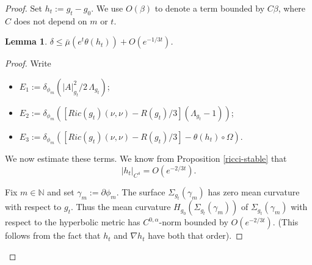 \documentclass[11pt]{amsart}
\def\N{\mathbb N}
\newtheorem{lemm}[thm]{Lemma}
\theoremstyle{remark}
\theoremstyle{definition}
\begin{document}
{{\begin{proof}
		Set $h_t:=g_t-g_0$. We use $O(\beta)$ to denote a term bounded by  $C\beta$, where $C$ does not depend on $m$ or $t$.
		\begin{lemm}
			$\delta \leq \bar\mu(e^t\theta(h_t))+O(e^{-1/3t})$.
		\end{lemm}
		\begin{proof}
			
			Write
			\begin{itemize}
				\item $E_1:=\delta_{\phi_m}({|A|^2_{g_t}}/{2}\,\Lambda_{g_t})$;
				\item $ E_2:=\delta_{\phi_m}([Ric(g_t)(\nu,\nu)-{R(g_t)/3}](\Lambda_{g_t}-1))$;
				\item$E_3:=\delta_{\phi_m}([Ric(g_t)(\nu,\nu)-{R(g_t)/3}]-\theta(h_t)\circ \Omega)$.
			\end{itemize}
			We now estimate these terms. We know from Proposition \ref{ricci-stable} that $$|h_t|_{C^4}=O(e^{-2/3t}).$$
			
			Fix $m\in\N$ and set $\gamma_m:=\partial \phi_m$. The surface $\Sigma_{g_t}(\gamma_m)$ has zero mean curvature with respect to $g_t$. Thus the mean curvature $H_{g_0}(\Sigma_{g_t}(\gamma_m))$ of $\Sigma_{g_t}(\gamma_m)$ with respect to the hyperbolic  metric   has $C^{0,\alpha}$-norm bounded  by $O(e^{-2/3t})$. (This follows from the fact that $h_t$ and $\nabla h_t$ have both that order). 
			
			
			

\end{proof}
\end{proof}}}
\end{document}
